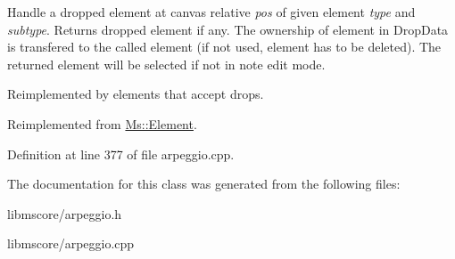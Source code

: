 Handle a dropped element at canvas relative {\itshape pos} of given element {\itshape type} and {\itshape subtype}. Returns dropped element if any. The ownership of element in Drop\+Data is transfered to the called element (if not used, element has to be deleted). The returned element will be selected if not in note edit mode.

Reimplemented by elements that accept drops. 

Reimplemented from \hyperlink{class_ms_1_1_element_a0ca69a9fb48e7b9fb481aacaf3860032}{Ms\+::\+Element}.



Definition at line 377 of file arpeggio.\+cpp.



The documentation for this class was generated from the following files\+:\begin{DoxyCompactItemize}
\item 
libmscore/arpeggio.\+h\item 
libmscore/arpeggio.\+cpp\end{DoxyCompactItemize}
